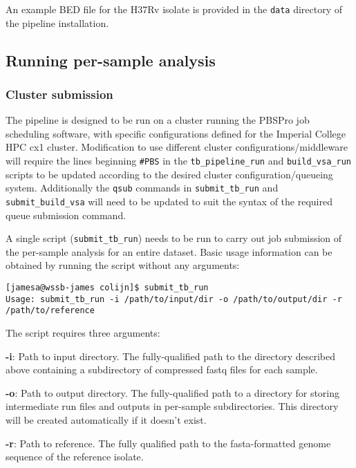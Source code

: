 \documentclass[a4paper,10pt,twoside]{article}
\newenvironment{tight_itemize}{
\begin{itemize}
  \setlength{\itemsep}{0pt}
  \setlength{\parskip}{0pt}
}{\end{itemize}}
\begin{document}
An example BED file for the H37Rv isolate is provided in the {\tt data}
directory of the pipeline installation.

\subsection {Running per-sample analysis}

\subsubsection {Cluster submission}

The pipeline is designed to be run on a cluster running the PBSPro job
scheduling software, with specific configurations defined for the Imperial
College HPC cx1 cluster. Modification to use different cluster
configurations/middleware will require the lines beginning {\tt \#PBS} in
the {\tt tb\_pipeline\_run} and {\tt build\_vsa\_run} scripts to be updated
according to the desired cluster configuration/queueing system. Additionally the
{\tt qsub} commands in {\tt submit\_tb\_run} and {\tt submit\_build\_vsa} will need
to be updated to suit the syntax of the required queue submission command. 

A single script ({\tt submit\_tb\_run}) needs to be run to carry out job
submission of the per-sample analysis for an entire dataset. Basic usage
information can be obtained by running the script without any arguments:

\begin{verbatim}
[jamesa@wssb-james colijn]$ submit_tb_run 
Usage: submit_tb_run -i /path/to/input/dir -o /path/to/output/dir -r /path/to/reference
\end{verbatim}

The script requires three arguments:

\begin{tight_itemize}
\item \textbf{-i}: Path to input directory. The fully-qualified path to
the directory described above containing a subdirectory of compressed fastq
files for each sample.
 \item \textbf{-o}: Path to output directory. The fully-qualified path to a
directory for storing intermediate run files and outputs in per-sample
subdirectories. This directory will be created automatically if it doesn't
exist. 
\item \textbf{-r}: Path to reference. The fully qualified path to the
fasta-formatted genome sequence of the reference isolate.
\end{tight_itemize}
\end{document}
